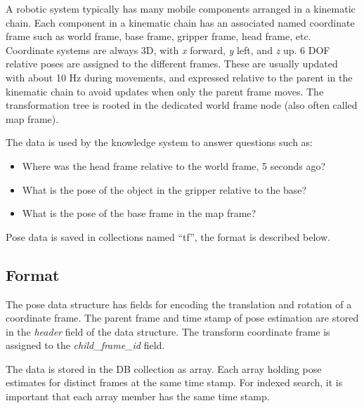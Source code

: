 
A robotic system typically has many mobile components arranged in a kinematic chain.
Each component in a kinematic chain has an associated named coordinate frame such as
world frame, base frame, gripper frame, head frame, etc.
Coordinate systems are always 3D, with \emph{x} forward, \emph{y} left, and \emph{z} up.
6 DOF relative poses are assigned to the different frames.
These are usually updated with about 10 Hz during movements, and
expressed relative to the 
parent in the kinematic chain to avoid updates when only the parent frame moves.
The transformation tree is rooted in the dedicated world frame node
(also often called map frame).

The data is used by the \ease knowledge system to answer questions such as:
\begin{itemize}
 \item Where was the head frame relative to the world frame, 5 seconds ago?
 \item What is the pose of the object in the gripper relative to the base?
 \item What is the pose of the base frame in the map frame? 
\end{itemize}


Pose data is saved in \mongodb collections named ``tf'', the format is described below.

\subsection{Format}
The pose data structure has
fields for encoding the translation and rotation of a coordinate frame.
The parent frame and time stamp of pose estimation
are stored in the \emph{header} field of the data structure.
The transform coordinate frame is assigned to the \emph{child\_frame\_id} field.

The data is stored in the DB collection as array.
Each array holding pose estimates for distinct frames
at the same time stamp.
For indexed search, it is important that each array
member has the same time stamp. \\

